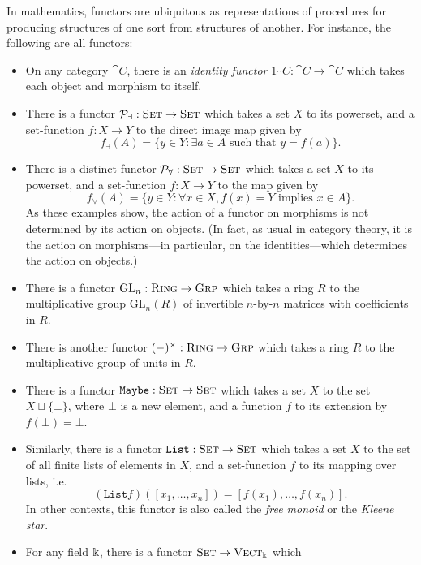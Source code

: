 \begin{ex}\label{ex:functors}
  In mathematics, functors are ubiquitous as representations of procedures for
  producing structures of one sort from structures of another. For instance, the
  following are all functors:
  \begin{itemize}
    \item On any category $\cat{C}$, there is an \emph{identity functor}
      $1_\cat{C}: \cat{C}\to\cat{C}$ which takes each object and morphism to
      itself.
    \item There is a functor $\mathcal{P}_\exists: {\textsc{\text{Set}}}\to{\textsc{\text{Set}}}$ which takes
      a set $X$ to its powerset, and a set-function $f: X\to Y$ to the direct
      image map given by \[
        f_\exists(A) = \{y\in Y: \exists a\in A \text{ such that } y = f(a)\}.
      \]
    \item There is a distinct functor $\mathcal{P}_\forall: {\textsc{\text{Set}}}\to{\textsc{\text{Set}}}$
      which takes a set $X$ to its powerset, and a set-function $f: X\to Y$ to
      the map given by \[
        f_\forall(A) = \{y\in Y: \forall x\in X, f(x) = Y \text{ implies } x\in A\}.
      \] As these examples show, the action of a functor on morphisms is not
      determined by its action on objects. (In fact, as usual in category
      theory, it is the action on morphisms---in particular, on the
      identities---which determines the action on objects.)
    \item There is a functor $\text{GL}_n: {\textsc{\text{Ring}}}\to{\textsc{\text{Grp}}}$ which takes a
      ring $R$ to the multiplicative group $\text{GL}_n(R)$ of invertible $n$-by-$n$
      matrices with coefficients in $R$.
    \item There is another functor $(-)^\times: {\textsc{\text{Ring}}}\to{\textsc{\text{Grp}}}$ which takes a
      ring $R$ to the multiplicative group of units in $R$.
    \item There is a functor $\texttt{Maybe}: {\textsc{\text{Set}}}\to{\textsc{\text{Set}}}$ which takes a
      set $X$ to the set $X\sqcup \{\bot\}$, where $\bot$ is a new element, and
      a function $f$ to its extension by $f(\bot) = \bot$.
    \item Similarly, there is a functor $\texttt{List}: {\textsc{\text{Set}}}\to{\textsc{\text{Set}}}$ which
      takes a set $X$ to the set of all finite lists of elements in $X$, and a
      set-function $f$ to its mapping over lists, i.e. \[
        (\texttt{List}f)([x_1, \ldots, x_n]) = [f(x_1), \ldots, f(x_n)].
      \]  In other contexts, this functor is also called the \emph{free
      monoid} or the \emph{Kleene star}.
    \item For any field $\Bbbk$, there is a functor ${\textsc{\text{Set}}}\to{\textsc{\text{Vect}}}_\Bbbk$ which

\end{itemize}
\end{ex}
